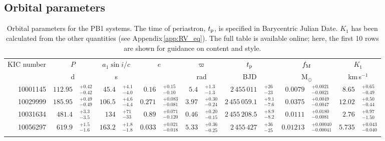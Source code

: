 \documentclass[a4paper,fleqn,usenatbib]{mnras}
\begin{document}
\subsection{Orbital parameters}
\label{ssec:orb_param}


\begin{table*}
\centering
\caption{Orbital parameters for the PB1 systems. The time of periastron, $t_{\rm p}$, is specified in Barycentric Julian Date. $K_1$ has been calculated from the other quantities (see Appendix\,\ref{app:RV_eq}). The full table is available online; here, the first 10 rows are shown for guidance on content and style.}
\label{tab:orbit}
\begin{tabular}{r r@{}l r@{}l r@{}l r@{}l r@{}l r@{}l r@{}l}
\toprule
\multicolumn{1}{c}{KIC number} & \multicolumn{2}{c}{$P$} & \multicolumn{2}{c}{$a_1 \sin i / c$} & \multicolumn{2}{c}{$e$} & \multicolumn{2}{c}{$\varpi$} & \multicolumn{2}{c}{$t_{\rm p}$} & \multicolumn{2}{c}{$f_{\rm M}$} & \multicolumn{2}{c}{$K_1$}\\
\multicolumn{1}{c}{} & \multicolumn{2}{c}{d} & \multicolumn{2}{c}{s} & \multicolumn{2}{c}{} & \multicolumn{2}{c}{rad} & \multicolumn{2}{c}{BJD} & \multicolumn{2}{c}{M$_{\odot}$} & \multicolumn{2}{c}{km\,s$^{-1}$}\\
\midrule
\vspace{1.5mm}
10001145 & $112.95$&$^{+0.42}_{-0.42}$ & $45.4$&$^{+4.1}_{-4.0}$ & $0.16$&$^{+0.15}_{-0.10}$ & $5.4$&$^{+1.3}_{-1.3}$ & $2\,455\,011$&$^{+26}_{-23}$ & $0.0079$&$^{+0.0021}_{-0.0021}$ & $8.65$&$^{+0.65}_{-0.49}$\\
\vspace{1.5mm}
10029999 & $185.95$&$^{+0.49}_{-0.49}$ & $106.5$&$^{+4.6}_{-4.4}$ & $0.271$&$^{+0.083}_{-0.081}$ & $3.97$&$^{+0.30}_{-0.24}$ & $2\,455\,059.1$&$^{+9.1}_{-7.6}$ & $0.0375$&$^{+0.0049}_{-0.0047}$ & $12.02$&$^{+0.50}_{-0.44}$\\
\vspace{1.5mm}
10031634 & $481.4$&$^{+3.3}_{-3.5}$ & $134$&$^{+71}_{-33}$ & $0.89$&$^{+0.071}_{-0.120}$ & $0.46$&$^{+0.20}_{-0.15}$ & $2\,455\,208.5$&$^{+8.9}_{-8.2}$ & $0.0111$&$^{+0.0180}_{-0.0081}$ & $2.76$&$^{+0.97}_{-1.50}$\\
\vspace{1.5mm}
10056297 & $619.9$&$^{+1.5}_{-1.6}$ & $163.2$&$^{+1.8}_{-1.8}$ & $0.033$&$^{+0.021}_{-0.018}$ & $5.33$&$^{+0.36}_{-0.25}$ & $2\,455\,427$&$^{+36}_{-25}$ & $0.01213$&$^{+0.00040}_{-0.00041}$ & $5.735$&$^{+0.043}_{-0.040}$\\
\vspace{1.5mm}

\end{tabular}
\end{table*}
\end{document}
